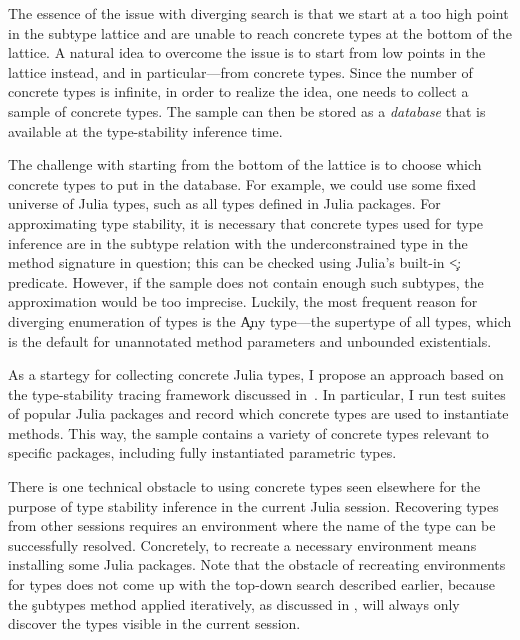 The essence of the issue with diverging search is that we start at a too high
point in the subtype lattice and are unable to reach concrete types at the
bottom of the lattice. 
A natural idea to overcome the issue is to start from
low points in the lattice instead, and in particular---from concrete types.
Since the number of concrete types is infinite,
in order to realize the idea, one needs to collect a sample of concrete types.
The sample can then be stored as a \emph{database} that is available at the
type-stability inference time.

The challenge with starting from the bottom of the lattice is to choose which concrete
types to put in the database.
For example, we could use some fixed universe of Julia types, 
such as all types defined in Julia packages. 
For approximating type stability, it is necessary that concrete
types used for type inference are in the subtype relation with the underconstrained type in the method
signature in question; this can be checked using Julia's built-in 
\c{<:} predicate. However, if the sample does not contain enough such subtypes,
the approximation would be too imprecise.
Luckily, the most frequent reason for diverging enumeration of types is the \c{Any}
type---the supertype of all types, which is the default for unannotated
method parameters and unbounded existentials.

As a startegy for collecting concrete Julia types, I propose an approach based
on the type-stability tracing framework discussed in~. In
particular, I run test suites of popular Julia packages and record which
concrete types are used to instantiate methods.
This way, the sample contains a variety of concrete types relevant to specific
packages, including fully instantiated parametric types.

There is one technical obstacle to using concrete types seen elsewhere for the purpose
of type stability inference in the current Julia session. Recovering types from
other sessions requires an environment where the name of the type can be
successfully resolved. Concretely, to recreate a necessary environment means
installing some Julia packages.
Note that the obstacle of recreating environments for types does not come up
with the top-down search described earlier, because the \c{subtypes} method
applied iteratively, as discussed in , will always only
discover the types visible in the current session.


